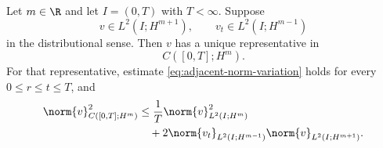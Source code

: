 \begin{lemma}
\label{lem:part-ii-adjacent-trace}
Let \(m\in\R\) and let \(I=(0,T)\) with \(T<\infty\).  Suppose
\begin{equation*}
 v\in L^2(I;H^{m+1}),
 \qquad
 v_t\in L^2(I;H^{m-1})
\end{equation*}
in the distributional sense.  Then \(v\) has a unique representative in
\begin{equation*}
 C([0,T];H^m).
\end{equation*}
For that representative, estimate
\eqref{eq:adjacent-norm-variation} holds for every
\(0\le r\le t\le T\), and
\begin{equation}
 \begin{aligned}
 \norm{v}_{C([0,T];H^m)}^2
 &\le \frac1T\norm{v}_{L^2(I;H^m)}^2
 \\
 &\quad+2
 \norm{v_t}_{L^2(I;H^{m-1})}
 \norm{v}_{L^2(I;H^{m+1})}.
 \end{aligned}
 \label{eq:adjacent-trace-quantitative}
\end{equation}
\end{lemma}

